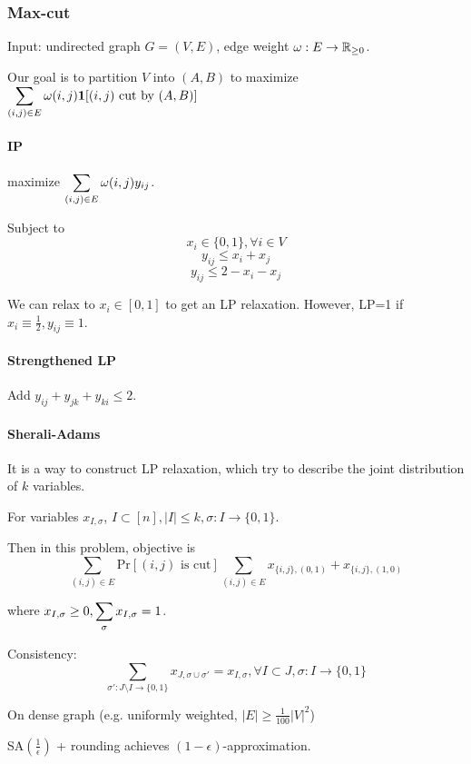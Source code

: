 
\subsubsection{Max-cut}
\begin{example}
    Input: undirected graph  $ G=(V,E) $, edge weight  $ \omega:E\rightarrow\mathbb R_{ \geq 0} $.
    
    Our goal is to partition  $ V  $ into  $ (A,B)  $ to maximize  $ \displaystyle\sum_{(i,j)\in E}\omega(i,j)\mathbf{1}[(i,j)\text{ cut by }(A,B)] $ 
\end{example}
\paragraph{IP} maximize  $ \displaystyle\sum_{(i,j)\in E}\omega(i,j)y_{ij} $.\

Subject to  \[x_i\in \{0,1\}, \forall i\in V \]
\[y_{ij} \leq x_i+x_j\]
\[y_{ij} \leq 2-x_i-x_j\]

We can relax to  $ x_i\in [0,1] $ to get an LP relaxation. However, LP=1 if  $ x_i\equiv \frac{1}{2},y_{ij}\equiv 1 $. 

\paragraph{Strengthened LP} Add  $ y_{ij}+y_{jk}+y_{ki} \leq 2 $.

\paragraph{Sherali-Adams} It is a way to construct LP relaxation, which try to  describe the joint distribution of  $ k $ variables. 

For variables  $ x_{I,\sigma} $,  $ I\subset [n],|I| \leq k,\sigma:I\rightarrow\{0,1\} $.

Then in this problem, objective is 
\[\sum_{(i,j)\in E}\mathrm{Pr}[(i,j)\text{ is cut}]\sum_{(i,j)\in E}x_{\{i,j\},(0,1)}+x_{\{i,j\},(1,0)}\]

where  $ x_{I,\sigma} \geq 0,\displaystyle\sum_{\sigma}x_{I,\sigma}=1 $.

Consistency: 
\[\sum_{\sigma':J\setminus I\rightarrow \{0,1\}}x_{J,\sigma\cup \sigma'}=x_{I,\sigma},\forall I\subset J,\sigma:I\rightarrow \{0,1\}\]

\begin{theorem}
    On dense graph (e.g. uniformly weighted,  $ |E| \geq \frac{1}{100}|V|^2 $)

    SA$ (\frac{1}{\epsilon}) $ + rounding achieves  $ (1-\epsilon) $-approximation. 
\end{theorem}

